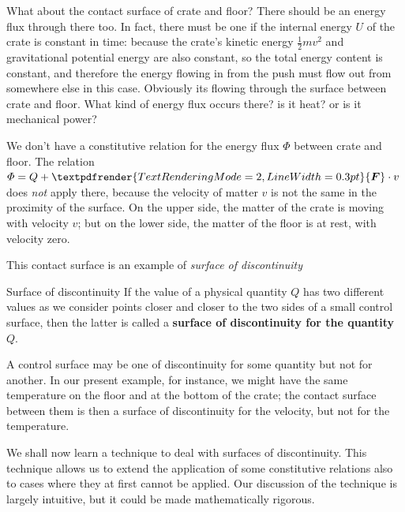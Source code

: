 \documentclass[a4paper,12pt,%
onecolumn,oneside,%
british%
]{memoir}
\renewcommand*{\bm}[1]{\textpdfrender{TextRenderingMode=2,LineWidth=0.3pt}{\boldsymbol{#1}}}
\renewcommand*{\|}[1][]{\nonscript\:#1\vert\nonscript\:\mathopen{}}
\newcommand*{\yM}{m}%
\newcommand*{\yU}{U}
\newcommand*{\yH}{\varPhi}%
\newcommand*{\yQ}{Q}%
\newcommand*{\yF}{\bm{F}}
\begin{document}
What about the contact surface of crate and floor? There should be an energy flux through there too. In fact, there must be one if the internal energy $\yU$ of the crate is constant in time: because the crate's kinetic energy $\tfrac12\yM v^{2}$ and gravitational potential energy are also constant, so the total energy content is constant, and therefore the energy flowing in from the push must flow out from somewhere else in this case. Obviously its flowing through the surface between crate and floor. What kind of energy flux occurs there? is it heat? or is it mechanical power?

We don't have a constitutive relation for the energy flux $\yH$ between crate and floor. The relation $\yH = \yQ + \yF\cdot v$ does \emph{not} apply there, because the velocity of matter $v$ is not the same in the proximity of the surface. On the upper side, the matter of the crate is moving with velocity $v$; but on the lower side, the matter of the floor is at rest, with velocity zero.

This contact surface is an example of \emph{surface of discontinuity}
\begin{definition}{Surface of discontinuity}
If the value of a physical quantity $Q$ has two different values as we consider points closer and closer to the two sides of a small control surface, then the latter is called a \textbf{surface of discontinuity for the quantity $Q$}.
\end{definition}
A control surface may be one of discontinuity for some quantity but not for another. In our present example, for instance, we might have the same temperature on the floor and at the bottom of the crate; the contact surface between them is then a surface of discontinuity for the velocity, but not for the temperature.

\smallskip

We shall now learn a technique to deal with surfaces of discontinuity. This technique allows us to extend the application of some constitutive relations also to cases where they at first cannot be applied. Our discussion of the technique is largely intuitive, but it could be made mathematically rigorous.
\end{document}
